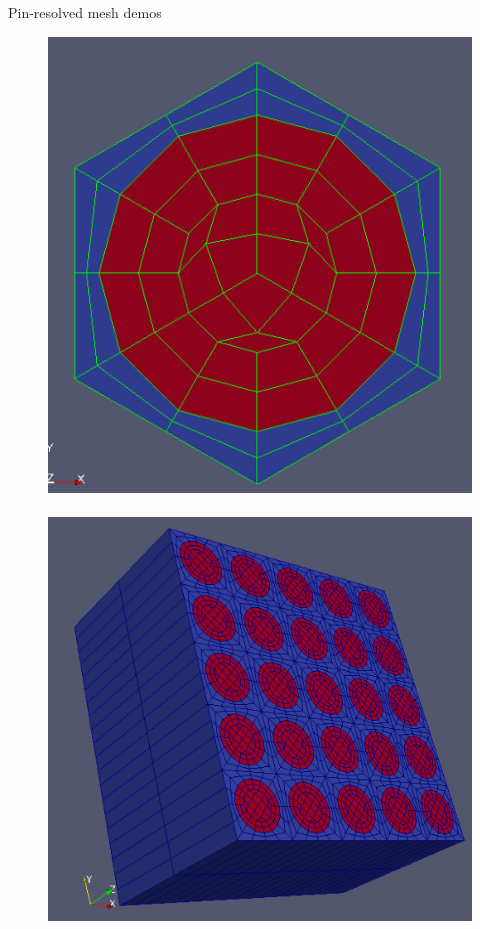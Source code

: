 \begin{frame}{Pin-resolved mesh demos}
	\begin{figure}
		\includegraphics*[scale=0.33]{graphic/mesh/hex-pin}
		~
		\includegraphics*[scale=0.3]{graphic/mesh/rods-3d}
	\end{figure}
\end{frame}

